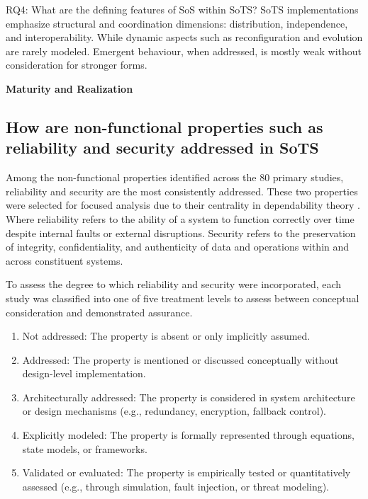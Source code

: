 \vspace{1em}
\begin{conclusionframe}{RQ4: What are the defining features of SoS within SoTS?}
SoTS implementations emphasize structural and coordination dimensions: distribution, independence, and interoperability. While dynamic aspects such as reconfiguration and evolution are rarely modeled. Emergent behaviour, when addressed, is mostly weak without consideration for stronger forms.\end{conclusionframe}




\vspace{0.5em}
\noindent \textbf{\large Maturity and Realization}
\vspace{-1em}


\subsection{How are non-functional properties such as reliability and security addressed in SoTS}\label{subsec:literature-review-results-rq5}
Among the non-functional properties identified across the 80 primary studies, reliability and security are the most consistently addressed. These two properties were selected for focused analysis due to their centrality in dependability theory \citep{avizienis2004basic}. Where reliability refers to the ability of a system to function correctly over time despite internal faults or external disruptions. Security refers to the preservation of integrity, confidentiality, and authenticity of data and operations within and across constituent systems.

To assess the degree to which reliability and security were incorporated, each study was classified into one of five treatment levels to assess between conceptual consideration and demonstrated assurance.

\begin{enumerate}\itemsep0em \parskip0em
    \item Not addressed: The property is absent or only implicitly assumed.
    \item Addressed: The property is mentioned or discussed conceptually without design-level implementation.
    \item Architecturally addressed: The property is considered in system architecture or design mechanisms (e.g., redundancy, encryption, fallback control).
    \item Explicitly modeled: The property is formally represented through equations, state models, or frameworks.
    \item Validated or evaluated: The property is empirically tested or quantitatively assessed (e.g., through simulation, fault injection, or threat modeling).
\end{enumerate}

